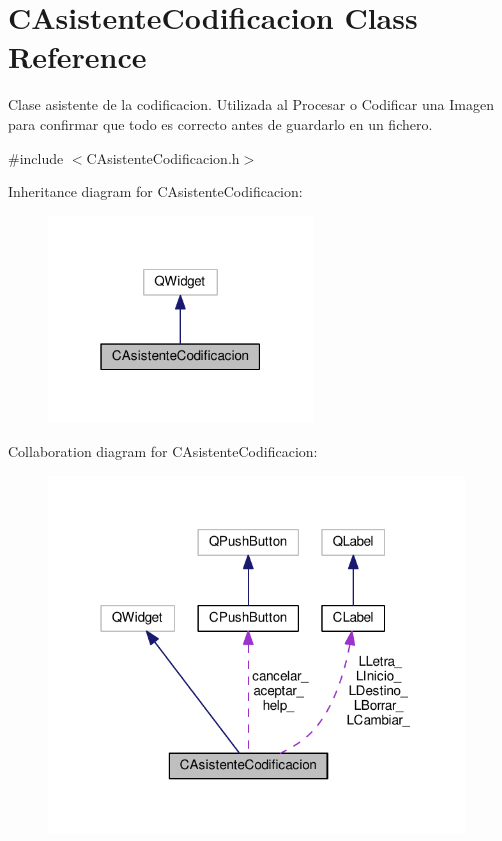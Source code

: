 \hypertarget{classCAsistenteCodificacion}{}\section{C\+Asistente\+Codificacion Class Reference}
\label{classCAsistenteCodificacion}


Clase asistente de la codificacion. Utilizada al Procesar o Codificar una Imagen para confirmar que todo es correcto antes de guardarlo en un fichero.  




{\ttfamily \#include $<$C\+Asistente\+Codificacion.\+h$>$}



Inheritance diagram for C\+Asistente\+Codificacion\+:
\nopagebreak
\begin{figure}[H]
\begin{center}
\leavevmode
\includegraphics[width=199pt]{classCAsistenteCodificacion__inherit__graph}
\end{center}
\end{figure}


Collaboration diagram for C\+Asistente\+Codificacion\+:
\nopagebreak
\begin{figure}[H]
\begin{center}
\leavevmode
\includegraphics[width=313pt]{classCAsistenteCodificacion__coll__graph}
\end{center}
\end{figure}
